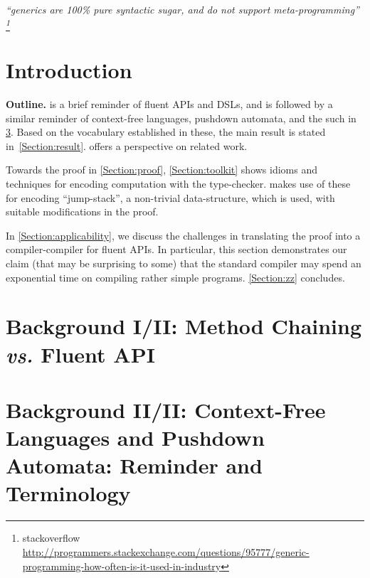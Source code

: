 \documentclass[a4paper,USenglish]{lipics}
\author{Anonymized for the submission}
\begin{document}
\maketitle
\hfill
  \parbox{40ex}{
    \begin{flushright}
    \scriptsize\itshape ``\protect \Java   generics are 100\protect\% pure syntactic sugar,
    and do not support meta-programming''%
    \footnote{
      stackoverflow
      \tiny
       \url{http://programmers.stackexchange.com/questions/95777/generic-programming-how-often-is-it-used-in-industry}
    }
    \end{flushright}
  }
\newline

\begin{abstract}
  
\end{abstract}

\section{Introduction}


\textbf{Outline.}
 is a brief reminder of fluent APIs 
  and DSLs, and is followed by a similar reminder of 
  context-free languages, pushdown automata, and the such in \cref{Section:pushdown}.
Based on the vocabulary established in these, 
  the main result is stated in~\cref{Section:result}.
 offers a perspective on related work.

Towards the proof in \cref{Section:proof}, \cref{Section:toolkit} 
  shows idioms and techniques for encoding computation with    
  the \Java type-checker.
 makes use of these for encoding 
  ``jump-stack'', a non-trivial data-structure,
  which is used, with suitable modifications in the proof. 

In \cref{Section:applicability}, we discuss the challenges in
  translating the proof into a compiler-compiler for fluent APIs.
In particular, this section demonstrates our claim (that may be
  surprising to some) that the standard \Java compiler may spend
  an exponential time on compiling rather simple programs.
\cref{Section:zz} concludes.

  
\section{Background I/II: Method Chaining \emph{vs.} Fluent API}
\label{Section:fluent}


\section{Background II/II: Context-Free Languages and Pushdown Automata: Reminder and Terminology}
\label{Section:pushdown}

\end{document}
